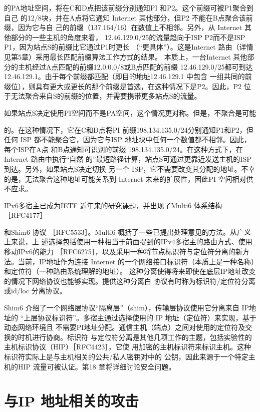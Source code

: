 的PA地址空间，将在C和D点把该前缀分别通知PI 和P2。这个前缀可被P1聚合到自己
的12/8块，并在A点将它通知 Internet 其他部分，但P2 不能在B点聚合该前缀，因为它与自
己的前缀（137.164/16）在数值上不相邻。另外，从 Internet 其他部分的一些主机的角度来看，
12.46.129.0/25的流量趋向于ISP P2而不是ISP P1，因为站点S的前缀比它通过P1时更长
（“更具体”）。这是Internet 路由（详情见第5章）采用最长匹配前缀算法工作方式的结果。
本质上，一台Internet 其他部分的主机经过A点匹配的前缀12.0.0.0/8或B点匹配的前缀
12.46.129.0/25都可到达12.46.129.1。由于每个前缀都匹配（即目的地址12.46.129.1 中包含
一组共同的前缀位），则具有更大或更长的那个前缀是首选，在这种情况下是P2。因此，P2
位于无法聚合来自S的前缀的位置，并需要携带更多站点S的流量。

如果站点S决定使用PI空间而不是PA空间，这个情况更对称。但是，不聚合是可能

的。在这种情况下，它在C和D点将PI 前缀198.134.135.0/24分别通知P1和P2，但任何
ISP 都不能聚合它，因为它与ISP 地址块中任何一个数值都不相邻。因此，每个ISP在A点
和B点通知可识别的前缀 198.134.135.0/24。在这种方式下，在Internet 路由中执行“自然
的”最短路径计算，站点S可通过更靠近发送主机的ISP 到达。另外，如果站点S决定切换
另一个 ISP，它不需要改变其分配的地址。不幸的是，无法聚合这种地址可能关系到 Internet
未来的扩展性，因此PI 空间相对供不应求。

IPv6多宿主已成为IETF 近年来的研究课题，并出现了Multi6 体系结构［RFC4177］

和Shim6 协议 ［RFC5533］。Multi6 概括了一些已提出处理意见的方法。从广义上来说，上
述选择包括使用一种相当于前面提到的IPv4多宿主的路由方式、使用移动IPv6的能力
［RFC6275］，以及采用一种将节点标识符与定位符分离的新方法。当前，IP地址作为连接
Internet 的一个网络接口标识符（本质上是一种名称）和定位符（一种路由系统理解的地址）。
这种分离使得将来即使在底层IP地址改变的情况下网络协议也能够实现。提供这种分离白
协议有时称为标识符/定位符分离或id/loc 分离协议。

Shim6 介绍了一个网络层协议“隔离层”（shim），传输层协议使用它分离来自 IP地址的
“上层协议标识符”。多宿主通过选择使用的 IP 地址（定位符）来实现，基于动态网络环境且
不需要PI地址分配。通信主机（端点）之间对使用的定位符及交换的时机进行协商。标识符
与定位符分离是其他几项工作的主题，包括实验性的主机标识协议（HIP）［RFC4423］，它使
用加密的主机标识符来标识主机。这种标识符实际上是与主机相关的公共/私人密钥对中的
公钥，因此来源于一个特定主机的HIP 流量可被认证。第18 章将详细讨论安全问题。

\section{与IP 地址相关的攻击}

